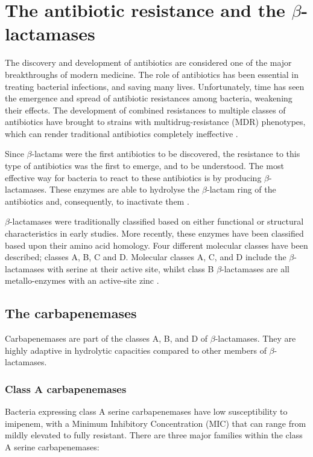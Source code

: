 \documentclass[11pt]{report}
\begin{document}
\chapter{The antibiotic resistance and the $\beta$-lactamases}

The discovery and development of antibiotics are considered one of the major breakthroughs of modern medicine.
The role of antibiotics has been essential in treating bacterial infections, and saving many lives.
Unfortunately, time has seen the emergence and spread of antibiotic resistances among bacteria, weakening their effects.
The development of combined resistances to multiple classes of antibiotics have brought to strains with multidrug-resistance (MDR) phenotypes, which can render traditional antibiotics completely ineffective \cite{Rossolini2014}.

Since $\beta$-lactams were the first antibiotics to be discovered, the resistance to this type of antibiotics was the first to emerge, and to be understood.
The most effective way for bacteria to react to these antibiotics is by producing $\beta$-lactamases.
These enzymes are able to hydrolyse the $\beta$-lactam ring of the antibiotics and, consequently, to inactivate them \cite{kong2010beta}.

$\beta$-lactamases were traditionally classified based on either functional or structural characteristics in early studies.
More recently, these enzymes have been classified based upon their amino acid homology.
Four different molecular classes have been described; classes A, B, C and D.
Molecular classes A, C, and D include the $\beta$-lactamases with serine at their active site, whilst class B $\beta$-lactamases are all metallo-enzymes with an active-site zinc \cite{Queenan2007}.

\section{The carbapenemases}
Carbapenemases are part of the classes A, B, and D of $\beta$-lactamases.
They are highly adaptive in hydrolytic capacities compared to other members of $\beta$-lactamases.

\subsection{Class A carbapenemases}
Bacteria expressing class A serine carbapenemases have low susceptibility to imipenem, with a Minimum Inhibitory Concentration (MIC) that can range from mildly elevated to fully resistant.
There are three major families within the class A serine carbapenemases:
\end{document}
